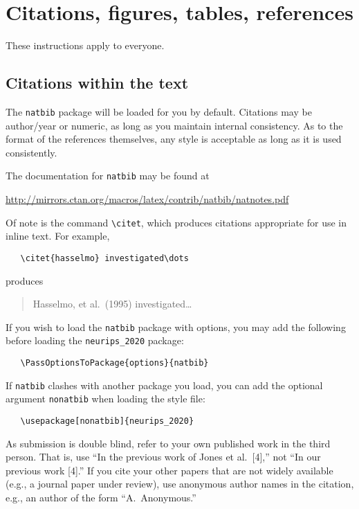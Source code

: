 \documentclass[10pt]{article}
\begin{document}
\section{Citations, figures, tables, references}
\label{others}

These instructions apply to everyone.

\subsection{Citations within the text}

The \verb+natbib+ package will be loaded for you by default.  Citations may be
author/year or numeric, as long as you maintain internal consistency.  As to the
format of the references themselves, any style is acceptable as long as it is
used consistently.

The documentation for \verb+natbib+ may be found at
\begin{center}
  \url{http://mirrors.ctan.org/macros/latex/contrib/natbib/natnotes.pdf}
\end{center}
Of note is the command \verb+\citet+, which produces citations appropriate for
use in inline text.  For example,
\begin{verbatim}
   \citet{hasselmo} investigated\dots
\end{verbatim}
produces
\begin{quote}
  Hasselmo, et al.\ (1995) investigated\dots
\end{quote}

If you wish to load the \verb+natbib+ package with options, you may add the
following before loading the \verb+neurips_2020+ package:
\begin{verbatim}
   \PassOptionsToPackage{options}{natbib}
\end{verbatim}

If \verb+natbib+ clashes with another package you load, you can add the optional
argument \verb+nonatbib+ when loading the style file:
\begin{verbatim}
   \usepackage[nonatbib]{neurips_2020}
\end{verbatim}

As submission is double blind, refer to your own published work in the third
person. That is, use ``In the previous work of Jones et al.\ [4],'' not ``In our
previous work [4].'' If you cite your other papers that are not widely available
(e.g., a journal paper under review), use anonymous author names in the
citation, e.g., an author of the form ``A.\ Anonymous.''
\end{document}
